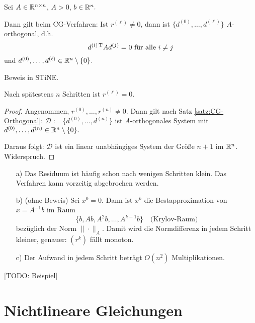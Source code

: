\begin{Satz}\label{satz:CG-Orthogonal}
Sei $A \in \mathbb R^{n\times n}$, $A > 0$, $b \in \mathbb R^n.$

Dann gilt beim CG-Verfahren: Ist $r^{(\ell)} \ne 0$, dann ist
$\{d^{(0)}, \ldots, d^{(\ell)}\}$ $A$-orthogonal, d.h. 
    $$d^{(i)\,\mathrm T} A d^{(j)} = 0\text{ für alle }i \ne j$$
und $d^{(0)}, \ldots, d^{(\ell)} \in \mathbb R^n \setminus \{0\}.$
\end{Satz}
Beweis in STiNE.

\begin{Korollar}
Nach spätestens $n$ Schritten ist $r^{(\ell)} = 0.$
\end{Korollar}
\begin{proof}
Angenommen, $r^{(0)}, \ldots, r^{(n)} \ne 0.$ Dann gilt nach Satz \ref{satz:CG-Orthogonal}:
$\mathcal D := \{d^{(0)}, \ldots, d^{(n)}\}$ ist $A$-orthogonales System mit
$d^{(0)}, \ldots, d^{(n)} \in \mathbb R^n \setminus \{0\}.$

Daraus folgt: $\mathcal D$ ist ein linear unabhängiges System der Größe $n+1$ im
$\mathbb R^n$. Widerspruch.
\end{proof}

\begin{Bemerkungen}
\quad
\begin{itemize}
  \item[a)] Das Residuum ist häufig schon nach wenigen Schritten klein. Das
    Verfahren kann vorzeitig abgebrochen werden.
  \item[b)] (ohne Beweis) Sei $x^0 = 0$. Dann ist $x^k$ die Bestapproximation
    von $x = A^{-1}b$ im Raum
      $$\{b, Ab, A^2 b, \ldots, A^{k-1} b\} \quad\text{(Krylov-Raum)}$$
    bezüglich der Norm $\|\cdot\|_A$.
    Damit wird die Normdifferenz in jedem Schritt kleiner, genauer:
    $(r^k)$ fällt monoton.
  \item[c)] Der Aufwand in jedem Schritt beträgt $O(n^2)$ Multiplikationen.
\end{itemize}
\end{Bemerkungen}

[TODO: Beispiel]

\section{Nichtlineare Gleichungen}
